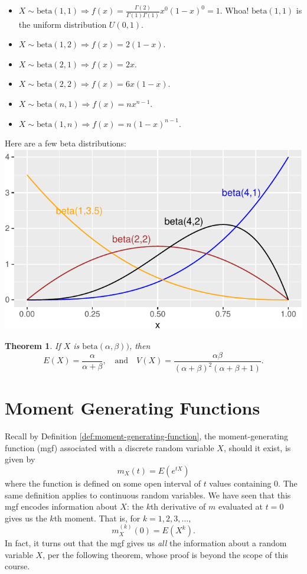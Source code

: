 \documentclass[
]{book}
\providecommand{\tightlist}{%
  \setlength{\itemsep}{0pt}\setlength{\parskip}{0pt}}
\newtheorem{theorem}{Theorem}[chapter]
\theoremstyle{definition}
\theoremstyle{definition}
\theoremstyle{definition}
\theoremstyle{definition}
\theoremstyle{remark}
\begin{document}
\begin{itemize}
\tightlist
\item
  \(\displaystyle X \sim \text{beta}(1,1) \Rightarrow f(x) = \frac{\Gamma(2)}{\Gamma(1)\Gamma(1)}x^0(1-x)^0 = 1\). Whoa! \(\text{beta}(1,1)\) is the uniform distribution \(U(0,1).\)
\item
  \(\displaystyle X \sim \text{beta}(1,2) \Rightarrow f(x) = 2(1-x)\).
\item
  \(\displaystyle X \sim \text{beta}(2,1) \Rightarrow f(x) = 2x\).
\item
  \(\displaystyle X \sim \text{beta}(2,2) \Rightarrow f(x) = 6x(1-x)\).
\item
  \(\displaystyle X \sim \text{beta}(n,1) \Rightarrow f(x) = nx^{n-1}\).
\item
  \(\displaystyle X \sim \text{beta}(1,n) \Rightarrow f(x) = n(1-x)^{n-1}\).
\end{itemize}

Here are a few beta distributions:
\includegraphics{math340-notes_files/figure-latex/unnamed-chunk-25-1.pdf}

\begin{theorem}
\protect\hypertarget{thm:beta-EandV}{}\label{thm:beta-EandV}If \(X\) is \(\text{beta}(\alpha,\beta))\), then \[E(X) = \frac{\alpha}{\alpha+\beta}, ~~~ \text{ and } ~~~ V(X) = \frac{\alpha\beta}{(\alpha+\beta)^2(\alpha+\beta+1)}.\]
\end{theorem}

\chapter{Moment Generating Functions}\label{mgf}

Recall by Definition \ref{def:moment-generating-function}, the moment-generating function (mgf) associated with a discrete random variable \(X\), should it exist, is given by \[m_X(t) = E(e^{tX})\] where the function is defined on some open interval of \(t\) values containing 0. The same definition applies to continuous random variables. We have seen that this mgf encodes information about \(X\): the \(k\)th derivative of \(m\) evaluated at \(t = 0\) gives us the \(k\)th moment. That is, for \(k = 1,2,3,\ldots\),
\[m_X^{(k)}(0) = E(X^k).\]
In fact, it turns out that the mgf gives us \emph{all} the information about a random variable \(X\), per the following theorem, whose proof is beyond the scope of this course.
\end{document}
